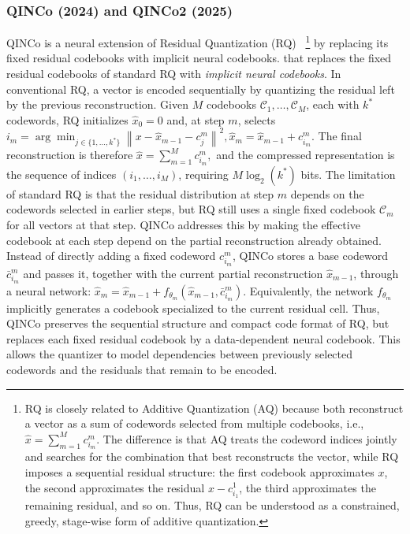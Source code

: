 \documentclass[sigconf]{acmart}
\begin{document}
\subsubsection{\textbf{QINCo (2024) and QINCo2 (2025)}} 
QINCo is a neural extension of Residual Quantization (RQ)~\cite{rq} \footnote{RQ is closely related to Additive Quantization (AQ) because both reconstruct a vector as a sum of codewords selected from multiple codebooks, i.e., \(\hat{x}=\sum_{m=1}^{M} c^m_{i_m}\). 
The difference is that AQ treats the codeword indices jointly and searches for the combination that best reconstructs the vector, while RQ imposes a sequential residual structure: the first codebook approximates \(x\), the second approximates the residual \(x-c^1_{i_1}\), the third approximates the remaining residual, and so on. 
Thus, RQ can be understood as a constrained, greedy, stage-wise form of additive quantization.} 
by replacing its fixed residual codebooks with implicit neural codebooks. that replaces the fixed residual codebooks of standard RQ with \emph{implicit neural codebooks}. 
In conventional RQ, a vector is encoded sequentially by quantizing the residual left by the previous reconstruction. 
Given $M$ codebooks $\mathcal{C}_1,\ldots,\mathcal{C}_M$, each with $k^{*}$ codewords, RQ initializes $\hat{x}_0=0$ and, at step $m$, selects
\(
i_m
=
\arg\min_{j \in \{1,\ldots,k^{*}\}}
\left\|
x-\hat{x}_{m-1}-c^m_j
\right\|^2,
\hat{x}_m
=
\hat{x}_{m-1}+c^m_{i_m}.
\)
The final reconstruction is therefore
\(
\hat{x}
=
\sum_{m=1}^{M} c^m_{i_m},
\)
and the compressed representation is the sequence of indices
\(
(i_1,\ldots,i_M)
\),
requiring $M\log_2(k^{*})$ bits.
The limitation of standard RQ is that the residual distribution at step $m$ depends on the codewords selected in earlier steps, but RQ still uses a single fixed codebook $\mathcal{C}_m$ for all vectors at that step. 
QINCo addresses this by making the effective codebook at each step depend on the partial reconstruction already obtained. 
Instead of directly adding a fixed codeword $c^m_{i_m}$, QINCo stores a base codeword $\bar{c}^m_{i_m}$ and passes it, together with the current partial reconstruction $\hat{x}_{m-1}$, through a neural network:
\(
\hat{x}_m
=
\hat{x}_{m-1}
+
f_{\theta_m}
\left(
\hat{x}_{m-1},\bar{c}^m_{i_m}
\right).
\)
Equivalently, the network $f_{\theta_m}$ implicitly generates a codebook specialized to the current residual cell. 
Thus, QINCo preserves the sequential structure and compact code format of RQ, but replaces each fixed residual codebook by a data-dependent neural codebook. 
This allows the quantizer to model dependencies between previously selected codewords and the residuals that remain to be encoded.
\end{document}
